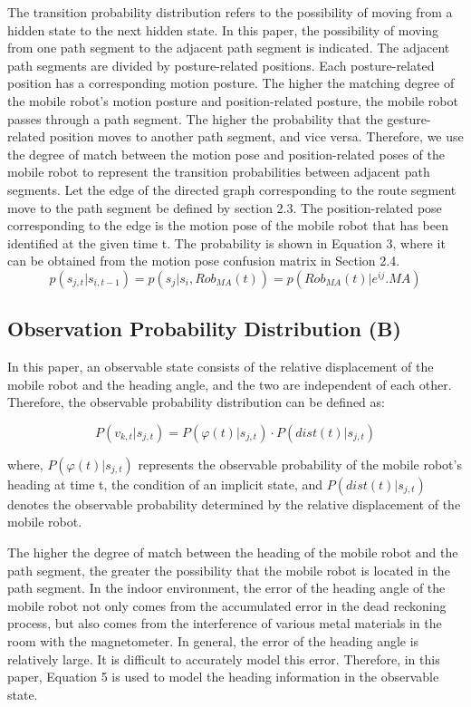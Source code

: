 \documentclass{llncs}
\begin{document}
The transition probability distribution refers to the possibility of moving from a hidden state to the next hidden state. In this paper, the possibility of moving from one path segment to the adjacent path segment is indicated. The adjacent path segments are divided by posture-related positions. Each posture-related position has a corresponding motion posture. The higher the matching degree of the mobile robot's motion posture and position-related posture, the mobile robot passes through a path segment. The higher the probability that the gesture-related position moves to another path segment, and vice versa. Therefore, we use the degree of match between the motion pose and position-related poses of the mobile robot to represent the transition probabilities between adjacent path segments. Let the edge of the directed graph corresponding to the route segment move to the path segment be defined by section 2.3. The position-related pose corresponding to the edge is the motion pose of the mobile robot that has been identified at the given time t. The probability is shown in Equation 3, where it can be obtained from the motion pose confusion matrix in Section 2.4.
\begin{equation}
	p({s_{j,t}}|{s_{i,t - 1}}) = p({s_j}|{s_i},Ro{b_{MA}}(t)) = p(Ro{b_{MA}}(t)|{e^{ij}}.MA)
\end{equation}

\subsection{Observation Probability Distribution (B)}

In this paper, an observable state consists of the relative displacement of the mobile robot and the heading angle, and the two are independent of each other. Therefore, the observable probability distribution can be defined as:

\begin{equation}
	P({v_{k,t}}|{s_{j,t}}) = P(\varphi (t)|{s_{j,t}}) \cdot P(dist(t)|{s_{j,t}})
\end{equation}

where, $P(\varphi (t)|{s_{j,t}})$ represents the observable probability of the mobile robot's heading at time t, the condition of an implicit state, and $P(dist(t)|{s_{j,t}})$ denotes the observable probability determined by the relative displacement of the mobile robot.

The higher the degree of match between the heading of the mobile robot and the path segment, the greater the possibility that the mobile robot is located in the path segment. In the indoor environment, the error of the heading angle of the mobile robot not only comes from the accumulated error in the dead reckoning process, but also comes from the interference of various metal materials in the room with the magnetometer. In general, the error of the heading angle is relatively large. It is difficult to accurately model this error. Therefore, in this paper, Equation 5 is used to model the heading information in the observable state.
\end{document}
